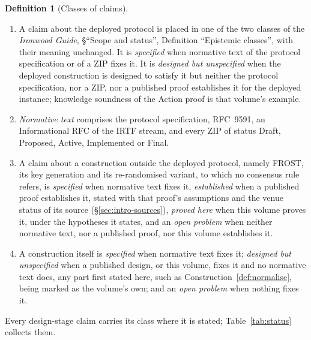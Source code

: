 \documentclass[11pt,a4paper]{article}
\theoremstyle{definition}
\newtheorem{definition}[theorem]{Definition}
\begin{document}
\begin{definition}[Classes of claims]\label{def:classes}
\leavevmode
\begin{enumerate}[label=(\roman*)]
\item A claim about the deployed protocol is placed in one of the two
  classes of the \emph{Ironwood Guide}, \S``Scope and status'', Definition
  ``Epistemic classes'', with their meaning unchanged. It is
  \emph{specified} when normative text of the protocol specification or of
  a ZIP fixes it. It is \emph{designed but unspecified} when the deployed
  construction is designed to satisfy it but neither the protocol
  specification, nor a ZIP, nor a published proof establishes it for the
  deployed instance; knowledge soundness of the Action proof is that
  volume's example.
\item \emph{Normative text} comprises the protocol specification, RFC~9591,
  an Informational RFC of the IRTF stream, and every ZIP of status Draft,
  Proposed, Active, Implemented or Final.
\item A claim about a construction outside the deployed protocol, namely
  FROST, its key generation and its re-randomised variant, to which no
  consensus rule refers, is \emph{specified} when normative text fixes it,
  \emph{established} when a published proof establishes it, stated with
  that proof's assumptions and the venue status of its source
  (\S\ref{sec:intro-sources}), \emph{proved here} when this volume proves
  it, under the hypotheses it states, and an \emph{open problem} when
  neither normative text, nor a published proof, nor this volume
  establishes it.
\item A construction itself is \emph{specified} when normative text fixes
  it; \emph{designed but unspecified} when a published design, or this
  volume, fixes it and no normative text does, any part first stated here,
  such as Construction~\ref{def:normalise}, being marked as the volume's
  own; and an \emph{open problem} when nothing fixes it.
\end{enumerate}
Every design-stage claim carries its class where it is stated;
Table~\ref{tab:status} collects them.
\end{definition}
\end{document}
